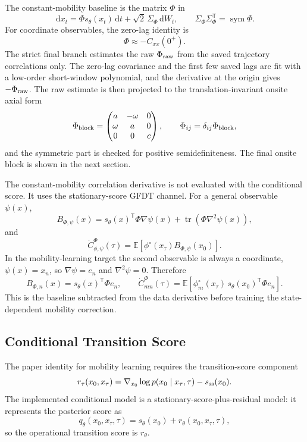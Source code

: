 \documentclass[11pt]{article}
\newcommand{\dd}{\,\mathrm{d}}
\newcommand{\E}{\mathbb{E}}
\newcommand{\T}{\mathsf{T}}
\begin{document}
The constant-mobility baseline is the matrix $\Phi$ in
\[
  \dd x_t=\Phi s_\theta(x_t)\dd t+\sqrt2\,\Sigma_\Phi\dd W_t,
  \qquad
  \Sigma_\Phi\Sigma_\Phi^\T=\operatorname{sym}\Phi .
\]
For coordinate observables, the zero-lag identity is
\[
  \Phi \approx -\dot C_{xx}(0^+).
\]
The strict final branch estimates the raw $\Phi_{\rm raw}$ from the saved
trajectory correlations only.  The zero-lag covariance and the first few saved
lags are fit with a low-order short-window polynomial, and the derivative at
the origin gives $-\Phi_{\rm raw}$.  The raw estimate is then projected to the
translation-invariant onsite axial form
\[
  \Phi_{\rm block}
  =
  \begin{pmatrix}
    a & -\omega & 0\\
    \omega & a & 0\\
    0 & 0 & c
  \end{pmatrix},
  \qquad
  \Phi_{ij}=\delta_{ij}\Phi_{\rm block},
\]
and the symmetric part is checked for positive semidefiniteness.  The final
onsite block is shown in the next section.

The constant-mobility correlation derivative is not evaluated with the
conditional score.  It uses the stationary-score GFDT channel.  For a general
observable $\psi(x)$,
\[
  B_{\Phi,\psi}(x)
  =
  s_\theta(x)^\T\Phi\nabla\psi(x)
  +
  \operatorname{tr}\!\left(\Phi\nabla^2\psi(x)\right),
\]
and
\[
  \dot C_{\phi,\psi}^{\Phi}(\tau)
  =
  \E\!\left[\phi^\circ(x_\tau)B_{\Phi,\psi}(x_0)\right].
\]
In the mobility-learning target the second observable is always a coordinate,
$\psi(x)=x_n$, so $\nabla\psi=e_n$ and $\nabla^2\psi=0$.  Therefore
\[
  B_{\Phi,n}(x)=s_\theta(x)^\T\Phi e_n,
  \qquad
  \dot C_{mn}^{\Phi}(\tau)
  =
  \E\!\left[\phi_m^\circ(x_\tau)\,s_\theta(x_0)^\T\Phi e_n\right].
\]
This is the baseline subtracted from the data derivative before training the
state-dependent mobility correction.

\subsection{Conditional Transition Score}

The paper identity for mobility learning requires the transition-score
component
\[
  r_\tau(x_0,x_\tau)
  =
  \nabla_{x_0}\log p(x_0\mid x_\tau,\tau)-s_{\rm ss}(x_0).
\]
The implemented conditional model is a stationary-score-plus-residual model:
it represents the posterior score as
\[
  q_\theta(x_0,x_\tau,\tau)
  =
  s_\theta(x_0)+r_\theta(x_0,x_\tau,\tau),
\]
so the operational transition score is $r_\theta$.
\end{document}
